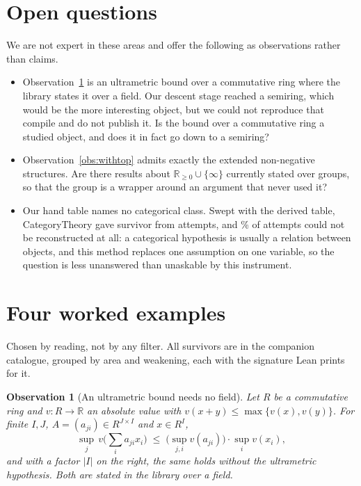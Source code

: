\documentclass[11pt]{article}
\newtheorem{observation}{Observation}
\begin{document}
\section{Open questions}\label{sec:questions}

We are not expert in these areas and offer the following as observations rather
than claims.

\begin{itemize}
\item Observation~\ref{obs:ultrametric} is an ultrametric bound over a
  commutative ring where the library states it over a field. Our descent stage
  reached a semiring, which would be the more interesting object, but we could
  not reproduce that compile and do not publish it. Is the bound over a
  commutative ring a studied object, and does it in fact go down to a semiring?
\item Observation~\ref{obs:withtop} admits exactly the extended non-negative
  structures. Are there results about $\mathbb{R}_{\ge 0} \cup \{\infty\}$
  currently stated over groups, so that the group is a wrapper around an
  argument that never used it?
\item Our hand table names no categorical class. Swept with the derived table,
  CategoryTheory gave \catSurvivors{} survivor from \catAttempts{} attempts, and
  \catContextPercent{}\% of attempts could not be reconstructed at all: a
  categorical hypothesis is usually a relation between objects, and this method
  replaces one assumption on one variable, so the question is less unanswered
than unaskable by this instrument.
\end{itemize}

\appendix

\section{Four worked examples}\label{app:obs}

Chosen by reading, not by any filter. All \allSurvivors{} survivors are in the
companion catalogue, grouped by area and weakening, each with the signature Lean
prints for it.

\begin{observation}[An ultrametric bound needs no field]\label{obs:ultrametric}
Let $R$ be a commutative ring and $v \colon R \to \mathbb{R}$ an absolute value with
$v(x+y) \le \max\{v(x),v(y)\}$. For finite $I,J$, $A = (a_{ji}) \in R^{J\times
I}$ and $x \in R^{I}$,
\[
  \sup_{j}\, v\!\Big(\sum_{i} a_{ji} x_i\Big)
  \;\le\; \Big(\sup_{j,i} v(a_{ji})\Big)\cdot \sup_{i} v(x_i),
\]
and with a factor $|I|$ on the right, the same holds without the ultrametric
hypothesis. Both are stated in the library over a field.
\end{observation}
\end{document}
